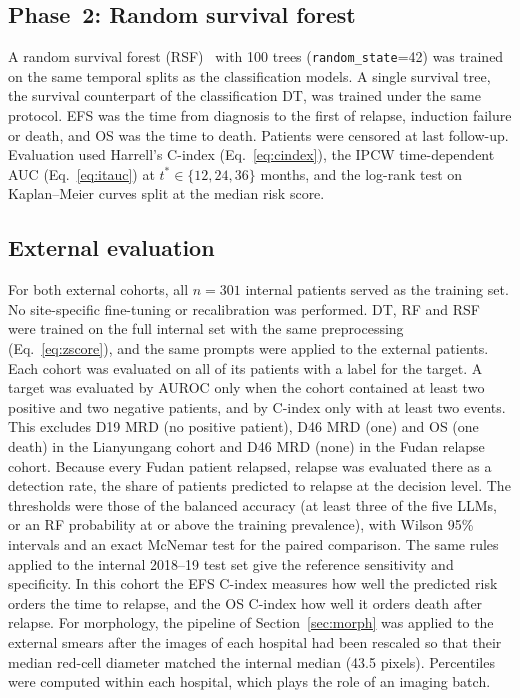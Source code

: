 \documentclass[pdflatex,sn-nature]{sn-jnl}
\begin{document}
\subsection{Phase~2: Random survival forest}\label{sec:rsf}

A random survival forest (RSF)~\cite{[CITE:Ishwaran2008]} with 100
trees (\texttt{random\_state}=42) was trained on the same temporal
splits as the classification models.
A single survival tree, the survival counterpart of the classification
DT, was trained under the same protocol.
EFS was the time from diagnosis to the first of relapse, induction
failure or death, and OS was the time to death.
Patients were censored at last follow-up.
Evaluation used Harrell's C-index (Eq.~\ref{eq:cindex}), the IPCW
time-dependent AUC (Eq.~\ref{eq:itauc}) at $t^*\in\{12,24,36\}$
months, and the log-rank test on Kaplan--Meier curves split at the
median risk score.

\subsection{External evaluation}\label{sec:ood}

For both external cohorts, all $n=301$ internal patients served as the
training set.
No site-specific fine-tuning or recalibration was performed.
DT, RF and RSF were trained on the full internal set with the same
preprocessing (Eq.~\ref{eq:zscore}), and the same prompts were applied
to the external patients.
Each cohort was evaluated on all of its patients with a label for the
target.
A target was evaluated by AUROC only when the cohort contained at least
two positive and two negative patients, and by C-index only with at
least two events.
This excludes D19 MRD (no positive patient), D46 MRD (one) and OS (one
death) in the Lianyungang cohort and D46 MRD (none) in the Fudan
relapse cohort.
Because every Fudan patient relapsed, relapse was evaluated there as a
detection rate, the share of patients predicted to relapse at the
decision level.
The thresholds were those of the balanced accuracy (at least three of
the five LLMs, or an RF probability at or above the training
prevalence), with Wilson 95\% intervals and an exact McNemar test for
the paired comparison.
The same rules applied to the internal 2018--19 test set give the
reference sensitivity and specificity.
In this cohort the EFS C-index measures how well the predicted risk
orders the time to relapse, and the OS C-index how well it orders death
after relapse.
For morphology, the pipeline of Section~\ref{sec:morph} was applied to
the external smears after the images of each hospital had been rescaled
so that their median red-cell diameter matched the internal median
(43.5 pixels).
Percentiles were computed within each hospital, which plays the role
of an imaging batch.
\end{document}
